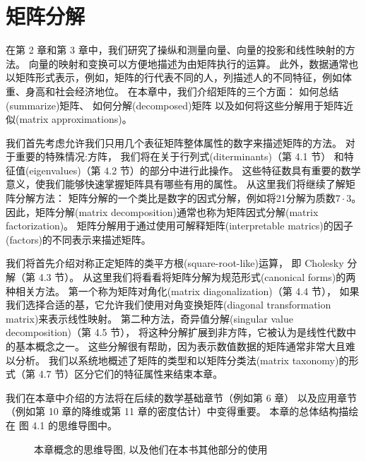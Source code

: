 \chapter{矩阵分解}
在第 2 章和第 3 章中，我们研究了操纵和测量向量、向量的投影和线性映射的方法。
向量的映射和变换可以方便地描述为由矩阵执行的运算。
此外，数据通常也以矩阵形式表示，例如，矩阵的行代表不同的人，列描述人的不同特征，例如体重、身高和社会经济地位。
在本章中，我们介绍矩阵的三个方面：
如何总结(summarize)矩阵、
如何分解(decomposed)矩阵
以及如何将这些分解用于矩阵近似(matrix approximations)。

我们首先考虑允许我们只用几个表征矩阵整体属性的数字来描述矩阵的方法。
对于重要的特殊情况:方阵，
我们将在关于行列式(diterminants)（第 4.1 节）
和特征值(eigenvalues)（第 4.2 节）的部分中进行此操作。
这些特征数具有重要的数学意义，使我们能够快速掌握矩阵具有哪些有用的属性。
从这里我们将继续了解矩阵分解方法：
矩阵分解的一个类比是数字的因式分解，例如将21分解为质数$7 \cdot 3$。
因此，矩阵分解(matrix decomposition)通常也称为矩阵因式分解(matrix factorization)。
矩阵分解用于通过使用可解释矩阵(interpretable matrics)的因子(factors)的不同表示来描述矩阵。

我们将首先介绍对称正定矩阵的类平方根(square-root-like)运算，
即 Cholesky 分解（第 4.3 节）。
从这里我们将看看将矩阵分解为规范形式(canonical forms)的两种相关方法。
第一个称为矩阵对角化(matrix diagonalization)（第 4.4 节），
如果我们选择合适的基，它允许我们使用对角变换矩阵(diagonal transformation matrix)来表示线性映射。
第二种方法，奇异值分解(singular value decomposition)（第 4.5 节），
将这种分解扩展到非方阵，它被认为是线性代数中的基本概念之一。
这些分解很有帮助，因为表示数值数据的矩阵通常非常大且难以分析。
我们以系统地概述了矩阵的类型和以矩阵分类法(matrix taxonomy)的形式（第 4.7 节）区分它们的特征属性来结束本章。

我们在本章中介绍的方法将在后续的数学基础章节（例如第 6 章）
以及应用章节（例如第 10 章的降维或第 11 章的密度估计）中变得重要。
本章的总体结构描绘在 图 4.1 的思维导图中。

\begin{figure}
\begin{tikzpicture}
\end{tikzpicture}
\caption{本章概念的思维导图, 以及他们在本书其他部分的使用}
\end{figure}

